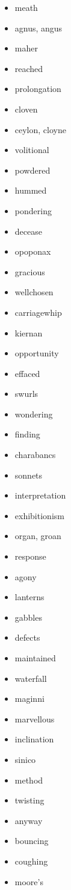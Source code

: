 \documentclass{article}
\begin{document}
\begin{itemize}
    \item meath
    \item agnus, angus
    \item maher
    \item reached
    \item prolongation
    \item cloven
    \item ceylon, cloyne
    \item volitional
    \item powdered
    \item hummed
    \item pondering
    \item decease
    \item opoponax
    \item gracious
    \item wellchosen
    \item carriagewhip
    \item kiernan
    \item opportunity
    \item effaced
    \item swurls
    \item wondering
    \item finding
    \item charabancs
    \item sonnets
    \item interpretation
    \item exhibitionism
    \item organ, groan
    \item response
    \item agony
    \item lanterns
    \item gabbles
    \item defects
    \item maintained
    \item waterfall
    \item maginni
    \item marvellous
    \item inclination
    \item sinico
    \item method
    \item twisting
    \item anyway
    \item bouncing
    \item coughing
    \item moore's

\end{itemize}
\end{document}
